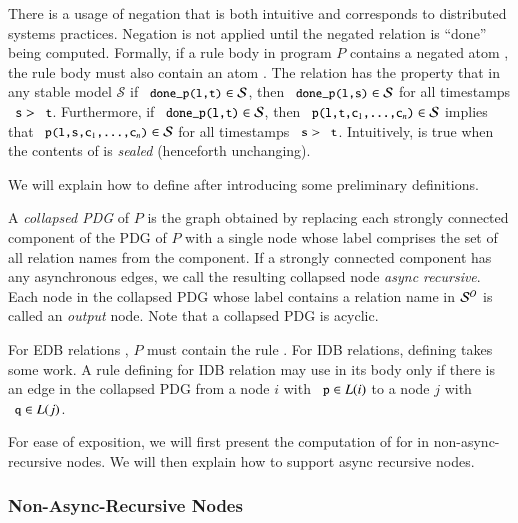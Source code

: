 
There is a usage of negation that is both intuitive and corresponds to distributed systems practices.  Negation is not applied until the negated relation is ``done'' being computed.  Formally, if a rule body in program $P$ contains a negated atom , the rule body must also contain an atom .  The relation  has the property that in any stable model $\mathcal{S}$ if $\dedalus{done_p(l,t)} \in \mathcal{S}$,  then $\dedalus{done_p(l,s)} \in \mathcal{S}$ for all timestamps $\dedalus{s} > \dedalus{t}$.  Furthermore, if $\dedalus{done_p(l,t)} \in \mathcal{S}$, then $\dedalus{p(l,t,c\sub{1},\ldots,c\sub{n})} \in \mathcal{S}$ implies that $\dedalus{p(l,s,c\sub{1},\ldots,c\sub{n})} \in \mathcal{S}$ for all timestamps $\dedalus{s} > \dedalus{t}$.  Intuitively,  is true when the contents of  is {\em sealed} (henceforth unchanging).

We will explain how to define  after introducing some preliminary definitions.

A {\em collapsed PDG} of $P$ is the graph obtained by replacing each strongly
connected component of the PDG of $P$ with a single node whose label comprises
the set of all relation names from the component.  If a strongly connected
component has any asynchronous edges, we call the resulting collapsed node {\em
  async recursive}.  Each node in the collapsed PDG whose label contains a
relation name in $\oschema$ is called an {\em output} node.  Note that a
collapsed PDG is acyclic.

For EDB relations , $P$ must contain the rule .  For
IDB relations, defining  takes some work.  A rule defining
 for IDB relation  may use  in
its body only if there is an edge in the collapsed PDG from a node $i$ with
$\dedalus{p} \in L(i)$ to a node $j$ with $\dedalus{q} \in L(j)$.

For ease of exposition, we will first present the computation of  for  in non-async-recursive nodes.  We will then explain how to support async recursive nodes.

\subsubsection{Non-Async-Recursive Nodes}


